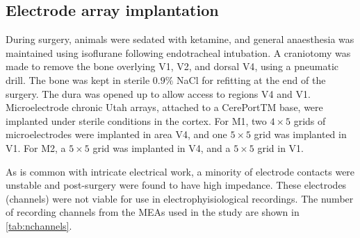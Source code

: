 \subsection{Electrode array implantation}

During surgery, animals were sedated with ketamine, and general anaesthesia was maintained using isoflurane following endotracheal intubation.
A craniotomy was made to remove the bone overlying \ac{V1}, \ac{V2}, and dorsal \ac{V4}, using a pneumatic drill.
The bone was kept in sterile $0.9\%$ \ac{NaCl} for refitting at the end of the surgery.
The dura was opened up to allow access to regions \ac{V4} and \ac{V1}.
Microelectrode chronic Utah arrays, attached to a CerePortTM base, were implanted under sterile conditions in the cortex.
For \ac{M1}, two $4{\times}5$ grids of microelectrodes were implanted in area \ac{V4}, and one $5{\times}5$ grid was implanted in \ac{V1}.
For \ac{M2}, a $5{\times}5$ grid was implanted in \ac{V4}, and a $5{\times}5$ grid in \ac{V1}.

As is common with intricate electrical work, a minority of electrode contacts were unstable and post-surgery were found to have high impedance.
These electrodes (channels) were not viable for use in electrophyisiological recordings.
The number of recording channels from the \acp{MEA} used in the study are shown in \autoref{tab:nchannels}.

